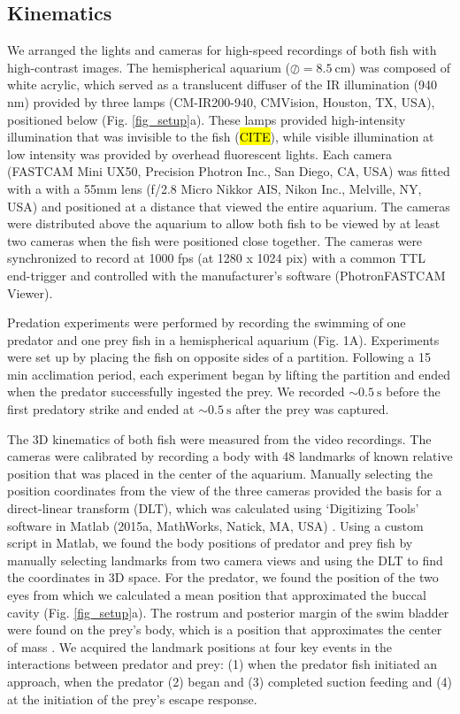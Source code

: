 \documentclass[]{rsos}%
\begin{document}
\subsection{Kinematics}
We arranged the lights and cameras for high-speed recordings of both fish with high-contrast images. 
The hemispherical aquarium ($\oslash = \SI{8.5}{\cm}$) was composed of white acrylic, which served as a translucent diffuser of the IR illumination (940 nm) provided by three lamps (CM-IR200-940, CMVision, Houston, TX, USA), positioned below (Fig. \ref{fig_setup}a). 
These lamps provided high-intensity illumination that was invisible to the fish (\hl{CITE}), while visible illumination at low intensity was provided by overhead fluorescent lights.
Each camera (FASTCAM Mini UX50, Precision Photron Inc., San Diego, CA, USA) was fitted with a with a 55mm lens (f/2.8 Micro Nikkor AIS, Nikon Inc., Melville, NY, USA) and positioned at a distance that viewed the entire aquarium. 
The cameras were distributed above the aquarium to allow both fish to be viewed by at least two cameras when the fish were positioned close together.
The cameras were synchronized to record at 1000 fps (at 1280 x 1024 pix) with a common TTL end-trigger and controlled with the manufacturer's software (PhotronFASTCAM Viewer).

Predation experiments were performed by recording the swimming of one predator and one prey fish in a hemispherical aquarium (Fig. 1A). 
Experiments were set up by placing the fish on opposite sides of a partition.
Following a 15 min acclimation period, each experiment began by lifting the partition and ended when the predator successfully ingested the prey.
We recorded $\sim \SI{0.5}{\s}$ before the first predatory strike and ended at $\sim \SI{0.5}{\s}$  after the prey was captured.

The 3D kinematics of both fish were measured from the video recordings. 
The cameras were calibrated by recording a body with 48 landmarks of known relative position that was placed in the center of the aquarium.
Manually selecting the position coordinates from the view of the three cameras provided the basis for a direct-linear transform (DLT), which was calculated using  `Digitizing Tools' software in Matlab (2015a, MathWorks, Natick, MA, USA) \cite{Hedrick:2008wz}.
Using a custom script in Matlab, we found the body positions of predator and prey fish by manually selecting landmarks from two camera views and using the DLT to find the coordinates in 3D space.
For the predator, we found the position of the two eyes from which we calculated a mean position that approximated the buccal cavity (Fig. \ref{fig_setup}a).
The rostrum and posterior margin of the swim bladder were found on the prey's body, which is a position that approximates the center of mass \cite{Stewart:2010ig}.
We acquired the landmark positions at four key events in the interactions between predator and prey: (1) when the predator fish initiated an approach, when the predator (2) began and (3) completed suction feeding and (4) at the initiation of the prey's escape response.
\end{document}
